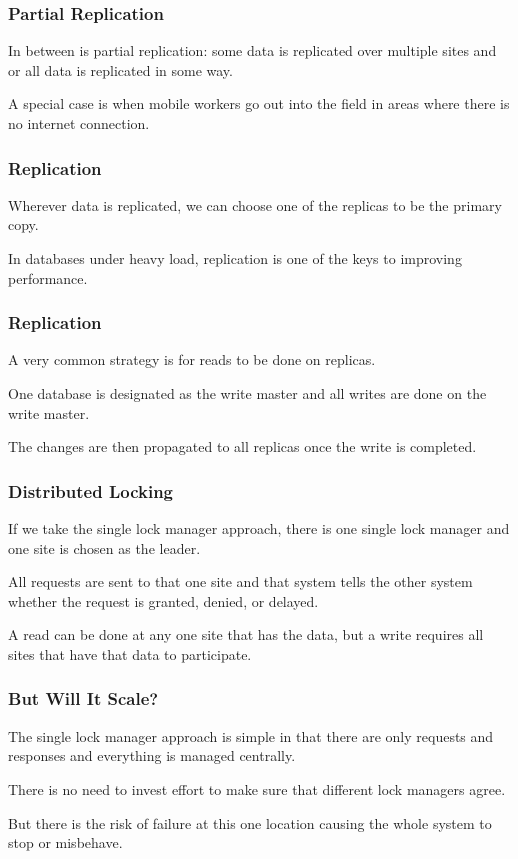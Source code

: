 \begin{frame}
\frametitle{Partial Replication}

In between is partial replication: some data is replicated over multiple sites and or all data is replicated in some way. 

A special case is when mobile workers go out into the field in areas where there is no internet connection.

\end{frame}


\begin{frame}
\frametitle{Replication}
Wherever data is replicated, we can choose one of the replicas to be the primary copy.

In databases under heavy load, replication is one of the keys to improving performance. 

\end{frame}


\begin{frame}
\frametitle{Replication}

A very common strategy is for reads to be done on replicas. 

One database is designated as the write master and all writes are done on the write master. 

The changes are then propagated to all replicas once the write is completed.


\end{frame}


\begin{frame}
\frametitle{Distributed Locking}

If we take the single lock manager approach, there is one single lock manager and one site is chosen as the leader. 

All requests are sent to that one site and that system tells the other system whether the request is granted, denied, or delayed. 

A read can be done at any one site that has the data, but a write requires all sites that have that data to participate.


\end{frame}


\begin{frame}
\frametitle{But Will It Scale?}

The single lock manager approach is simple in that there are only requests and responses and everything is managed centrally.

There is no need to invest effort to make sure that different lock managers agree. 

But there is the risk of failure at this one location causing the whole system to stop or misbehave.


\end{frame}

